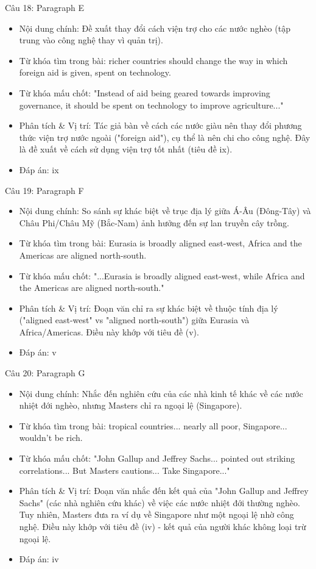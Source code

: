 \documentclass{../templateReading/cdreading}
\begin{document}
Câu 18: Paragraph E
\begin{itemize}
\item Nội dung chính: Đề xuất thay đổi cách viện trợ cho các nước nghèo (tập trung vào công nghệ thay vì quản trị).
\item Từ khóa tìm trong bài: richer countries should change the way in which foreign aid is given, spent on technology.
\item Từ khóa mấu chốt: "Instead of aid being geared towards improving governance, it should be spent on technology to improve agriculture..."
\item Phân tích \& Vị trí: Tác giả bàn về cách các nước giàu nên thay đổi phương thức viện trợ nước ngoài ("foreign aid"), cụ thể là nên chi cho công nghệ. Đây là đề xuất về cách sử dụng viện trợ tốt nhất (tiêu đề ix).
\item Đáp án: ix
\end{itemize}

Câu 19: Paragraph F
\begin{itemize}
\item Nội dung chính: So sánh sự khác biệt về trục địa lý giữa Á-Âu (Đông-Tây) và Châu Phi/Châu Mỹ (Bắc-Nam) ảnh hưởng đến sự lan truyền cây trồng.
\item Từ khóa tìm trong bài: Eurasia is broadly aligned east-west, Africa and the Americas are aligned north-south.
\item Từ khóa mấu chốt: "...Eurasia is broadly aligned east-west, while Africa and the Americas are aligned north-south."
\item Phân tích \& Vị trí: Đoạn văn chỉ ra sự khác biệt về thuộc tính địa lý ("aligned east-west" vs "aligned north-south") giữa Eurasia và Africa/Americas. Điều này khớp với tiêu đề (v).
\item Đáp án: v
\end{itemize}

Câu 20: Paragraph G
\begin{itemize}
\item Nội dung chính: Nhắc đến nghiên cứu của các nhà kinh tế khác về các nước nhiệt đới nghèo, nhưng Masters chỉ ra ngoại lệ (Singapore).
\item Từ khóa tìm trong bài: tropical countries... nearly all poor, Singapore... wouldn't be rich.
\item Từ khóa mấu chốt: "John Gallup and Jeffrey Sachs... pointed out striking correlations... But Masters cautions... Take Singapore..."
\item Phân tích \& Vị trí: Đoạn văn nhắc đến kết quả của "John Gallup and Jeffrey Sachs" (các nhà nghiên cứu khác) về việc các nước nhiệt đới thường nghèo. Tuy nhiên, Masters đưa ra ví dụ về Singapore như một ngoại lệ nhờ công nghệ. Điều này khớp với tiêu đề (iv) - kết quả của người khác không loại trừ ngoại lệ.
\item Đáp án: iv
\end{itemize}
\end{document}
